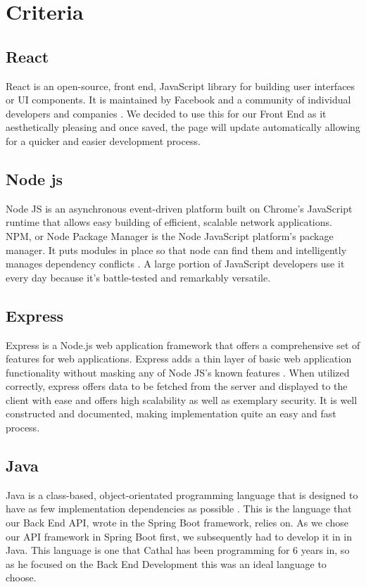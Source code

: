 \section{Criteria}
\subsection{React}
React is an open-source, front end, JavaScript library for building user interfaces or UI components. It is maintained by Facebook and a community of individual developers and companies \cite{React}. We decided to use this for our Front End as it aesthetically pleasing and once saved, the page will update automatically allowing for a quicker and easier development process.

\subsection{Node js}
Node JS is an asynchronous event-driven platform built on Chrome's JavaScript runtime that allows easy building of efficient, scalable network applications. NPM, or Node Package Manager is the Node JavaScript platform's package manager. It puts modules in place so that node can find them and intelligently manages dependency conflicts \cite{NodsJS}. A large portion of JavaScript developers use it every day because it's battle-tested and remarkably versatile.

\subsection{Express}
Express is a Node.js web application framework that offers a comprehensive set of features for web applications. Express adds a thin layer of basic web application functionality without masking any of Node JS's known features \cite{ExpressJS}. When utilized correctly, express offers data to be fetched from the server and displayed to the client with ease and offers high scalability as well as exemplary security. It is well constructed and documented, making implementation quite an easy and fast process.

\subsection{Java}
Java is a class-based, object-orientated programming language that is designed to have as few implementation dependencies as possible \cite{Java}. This is the language that our Back End API, wrote in the Spring Boot framework, relies on. As we chose our API framework in Spring Boot first, we subsequently had to develop it in in Java. This language is one that Cathal has been programming for 6 years in, so as he focused on the Back End Development this was an ideal language to choose.

